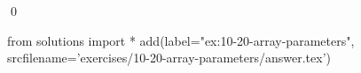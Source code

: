 
\begin{ex}
  \label{ex:10-20-array-parameters}
  
  \qed
\end{ex}
\begin{python0}
from solutions import *
add(label="ex:10-20-array-parameters",
    srcfilename='exercises/10-20-array-parameters/answer.tex')
\end{python0}
